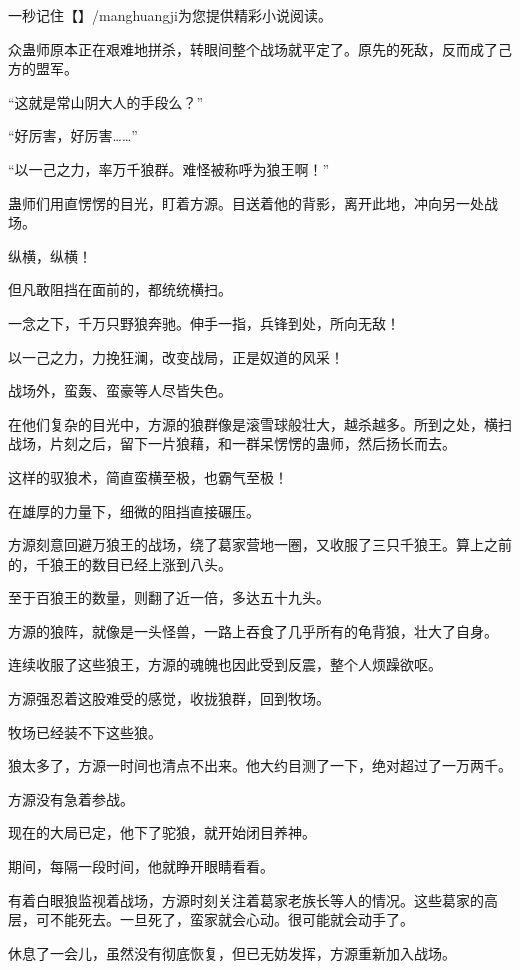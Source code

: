 
\begin{this_body}

一秒记住【】/manghuangji为您提供精彩小说阅读。

众蛊师原本正在艰难地拼杀，转眼间整个战场就平定了。原先的死敌，反而成了己方的盟军。

“这就是常山阴大人的手段么？”

“好厉害，好厉害……”

“以一己之力，率万千狼群。难怪被称呼为狼王啊！”

蛊师们用直愣愣的目光，盯着方源。目送着他的背影，离开此地，冲向另一处战场。

纵横，纵横！

但凡敢阻挡在面前的，都统统横扫。

一念之下，千万只野狼奔驰。伸手一指，兵锋到处，所向无敌！

以一己之力，力挽狂澜，改变战局，正是奴道的风采！

战场外，蛮轰、蛮豪等人尽皆失色。

在他们复杂的目光中，方源的狼群像是滚雪球般壮大，越杀越多。所到之处，横扫战场，片刻之后，留下一片狼藉，和一群呆愣愣的蛊师，然后扬长而去。

这样的驭狼术，简直蛮横至极，也霸气至极！

在雄厚的力量下，细微的阻挡直接碾压。

方源刻意回避万狼王的战场，绕了葛家营地一圈，又收服了三只千狼王。算上之前的，千狼王的数目已经上涨到八头。

至于百狼王的数量，则翻了近一倍，多达五十九头。

方源的狼阵，就像是一头怪兽，一路上吞食了几乎所有的龟背狼，壮大了自身。

连续收服了这些狼王，方源的魂魄也因此受到反震，整个人烦躁欲呕。

方源强忍着这股难受的感觉，收拢狼群，回到牧场。

牧场已经装不下这些狼。

狼太多了，方源一时间也清点不出来。他大约目测了一下，绝对超过了一万两千。

方源没有急着参战。

现在的大局已定，他下了驼狼，就开始闭目养神。

期间，每隔一段时间，他就睁开眼睛看看。

有着白眼狼监视着战场，方源时刻关注着葛家老族长等人的情况。这些葛家的高层，可不能死去。一旦死了，蛮家就会心动。很可能就会动手了。

休息了一会儿，虽然没有彻底恢复，但已无妨发挥，方源重新加入战场。


\end{this_body}
